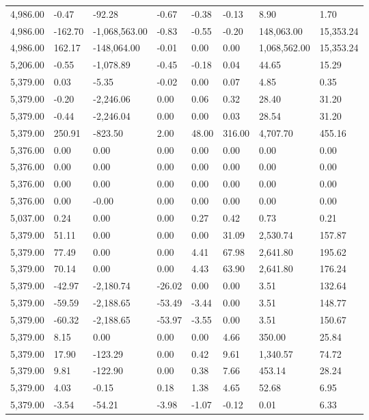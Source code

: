 \begin{longtable}{llllllll}
4,986.00 & -0.47 & -92.28 & -0.67 & -0.38 & -0.13 & 8.90 & 1.70 \\
4,986.00 & -162.70 & -1,068,563.00 & -0.83 & -0.55 & -0.20 & 148,063.00 & 15,353.24 \\
4,986.00 & 162.17 & -148,064.00 & -0.01 & 0.00 & 0.00 & 1,068,562.00 & 15,353.24 \\
5,206.00 & -0.55 & -1,078.89 & -0.45 & -0.18 & 0.04 & 44.65 & 15.29 \\
5,379.00 & 0.03 & -5.35 & -0.02 & 0.00 & 0.07 & 4.85 & 0.35 \\
5,379.00 & -0.20 & -2,246.06 & 0.00 & 0.06 & 0.32 & 28.40 & 31.20 \\
5,379.00 & -0.44 & -2,246.04 & 0.00 & 0.00 & 0.03 & 28.54 & 31.20 \\
5,379.00 & 250.91 & -823.50 & 2.00 & 48.00 & 316.00 & 4,707.70 & 455.16 \\
5,376.00 & 0.00 & 0.00 & 0.00 & 0.00 & 0.00 & 0.00 & 0.00 \\
5,376.00 & 0.00 & 0.00 & 0.00 & 0.00 & 0.00 & 0.00 & 0.00 \\
5,376.00 & 0.00 & 0.00 & 0.00 & 0.00 & 0.00 & 0.00 & 0.00 \\
5,376.00 & 0.00 & -0.00 & 0.00 & 0.00 & 0.00 & 0.00 & 0.00 \\
5,037.00 & 0.24 & 0.00 & 0.00 & 0.27 & 0.42 & 0.73 & 0.21 \\
5,379.00 & 51.11 & 0.00 & 0.00 & 0.00 & 31.09 & 2,530.74 & 157.87 \\
5,379.00 & 77.49 & 0.00 & 0.00 & 4.41 & 67.98 & 2,641.80 & 195.62 \\
5,379.00 & 70.14 & 0.00 & 0.00 & 4.43 & 63.90 & 2,641.80 & 176.24 \\
5,379.00 & -42.97 & -2,180.74 & -26.02 & 0.00 & 0.00 & 3.51 & 132.64 \\
5,379.00 & -59.59 & -2,188.65 & -53.49 & -3.44 & 0.00 & 3.51 & 148.77 \\
5,379.00 & -60.32 & -2,188.65 & -53.97 & -3.55 & 0.00 & 3.51 & 150.67 \\
5,379.00 & 8.15 & 0.00 & 0.00 & 0.00 & 4.66 & 350.00 & 25.84 \\
5,379.00 & 17.90 & -123.29 & 0.00 & 0.42 & 9.61 & 1,340.57 & 74.72 \\
5,379.00 & 9.81 & -122.90 & 0.00 & 0.38 & 7.66 & 453.14 & 28.24 \\
5,379.00 & 4.03 & -0.15 & 0.18 & 1.38 & 4.65 & 52.68 & 6.95 \\
5,379.00 & -3.54 & -54.21 & -3.98 & -1.07 & -0.12 & 0.01 & 6.33 \\

\end{longtable}
